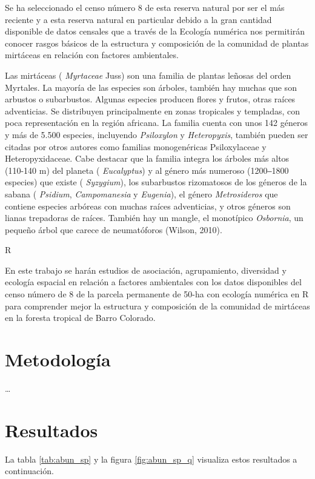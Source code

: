 \documentclass[11pt,]{article}
\begin{document}
Se ha seleccionado el censo número 8 de esta reserva natural por ser el
más reciente y a esta reserva natural en particular debido a la gran
cantidad disponible de datos censales que a través de la Ecología
numérica nos permitirán conocer rasgos básicos de la estructura y
composición de la comunidad de plantas mirtáceas en relación con
factores ambientales.

Las mirtáceas ( \emph{Myrtaceae} Juss) son una familia de plantas
leñosas del orden Myrtales. La mayoría de las especies son árboles,
también hay muchas que son arbustos o subarbustos. Algunas especies
producen flores y frutos, otras raíces adventicias. Se distribuyen
principalmente en zonas tropicales y templadas, con poca representación
en la región africana. La familia cuenta con unos 142 géneros y más de
5.500 especies, incluyendo \emph{Psiloxylon} y \emph{Heteropyxis},
también pueden ser citadas por otros autores como familias monogenéricas
Psiloxylaceae y Heteropyxidaceae. Cabe destacar que la familia integra
los árboles más altos (110-140 m) del planeta ( \emph{Eucalyptus}) y al
género más numeroso (1200‒1800 especies) que existe ( \emph{Syzygium}),
los subarbustos rizomatosos de los géneros de la sabana (
\emph{Psidium}, \emph{Campomanesia} y \emph{Eugenia}), el género
\emph{Metrosideros} que contiene especies arbóreas con muchas raíces
adventicias, y otros géneros son lianas trepadoras de raíces. También
hay un mangle, el monotípico \emph{Osbornia}, un pequeño árbol que
carece de neumatóforos (Wilson, 2010).

R

En este trabajo se harán estudios de asociación, agrupamiento,
diversidad y ecología espacial en relación a factores ambientales con
los datos disponibles del censo número de 8 de la parcela permanente de
50-ha con ecología numérica en R para comprender mejor la estructura y
composición de la comunidad de mirtáceas en la foresta tropical de Barro
Colorado.

\section{Metodología}\label{metodologuxeda}

\ldots

\section{Resultados}\label{resultados}

La tabla \ref{tab:abun_sp} y la figura \ref{fig:abun_sp_q} visualiza
estos resultados a continuación.
\end{document}
